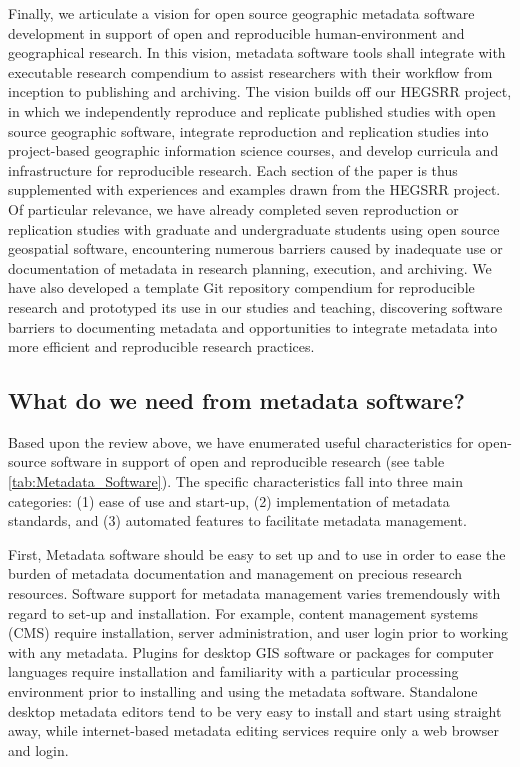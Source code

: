 \documentclass{isprs} %
\begin{document}
Finally, we articulate a vision for open source geographic metadata software development in support of open and reproducible human-environment and geographical research.
In this vision, metadata software tools shall integrate with executable research compendium to assist researchers with their workflow from inception to publishing and archiving.
The vision builds off our HEGSRR project, in which we independently reproduce and replicate published studies with open source geographic software, integrate reproduction and replication studies into project-based geographic information science courses, and develop curricula and infrastructure for reproducible research.
Each section of the paper is thus supplemented with experiences and examples drawn from the HEGSRR project.
Of particular relevance, we have already completed seven reproduction or replication studies with graduate and undergraduate students using open source geospatial software, encountering numerous barriers caused by inadequate use or documentation of metadata in research planning, execution, and archiving.
We have also developed a template Git repository compendium for reproducible research and prototyped its use in our studies and teaching, discovering software barriers to documenting metadata and opportunities to integrate metadata into more efficient and reproducible research practices.

\subsection{What do we need from metadata software?}\label{metadataneeds}

Based upon the review above, we have enumerated useful characteristics for open-source software in support of open and reproducible research (see table \ref{tab:Metadata_Software}).
The specific characteristics fall into three main categories: (1) ease of use and start-up, (2) implementation of metadata standards, and (3) automated features to facilitate metadata management.

First, Metadata software should be easy to set up and to use in order to ease the burden of metadata documentation and management on precious research resources.
Software support for metadata management varies tremendously with regard to set-up and installation.
For example, content management systems (CMS) require installation, server administration, and user login prior to working with any metadata. 
Plugins for desktop GIS software or packages for computer languages require installation and familiarity with a particular  processing environment prior to installing and using the metadata software. 
Standalone desktop metadata editors tend to be very easy to install and start using straight away, while internet-based metadata editing services require only a web browser and login.
\end{document}
